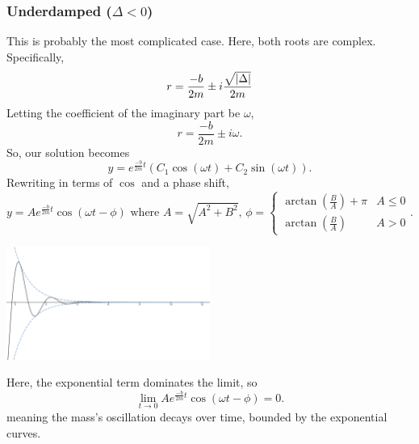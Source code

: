 \subsubsection{Underdamped ($\Delta < 0$)}
This is probably the most complicated case.
Here, both roots are complex.
Specifically,
\begin{equation*}
	r = \frac{-b}{2m} \pm i\frac{\sqrt{\lvert \Delta \rvert}}{2m}
\end{equation*}
Letting the coefficient of the imaginary part be $\omega$,
\begin{equation*}
	r = \frac{-b}{2m} \pm i\omega.
\end{equation*}
So, our solution becomes
\begin{equation*}
	y = e^{\frac{-b}{2m} t}\left(C_1\cos{(\omega t)} + C_2\sin{(\omega t)}\right).
\end{equation*}
Rewriting in terms of $\cos$ and a phase shift,
\begin{equation*}
	y = Ae^{\frac{-b}{2m} t}\cos{(\omega t - \phi)} \text{ where }
	A = \sqrt{A^2 + B^2} \text{, } \phi = \begin{cases}
		\arctan{\left(\frac{B}{A}\right)} + \pi & A \leq 0 \\
		\arctan{\left(\frac{B}{A}\right)} & A > 0
	\end{cases}.
\end{equation*}
\begin{center}
	\includegraphics[width=0.5\textwidth]{./higherOrder/freeVibrs/underdamped.png}
\end{center}
Here, the exponential term dominates the limit, so
\begin{equation*}
	\lim\limits_{t \to 0}{Ae^{\frac{-b}{2m}t}\cos{(\omega t - \phi)}} = 0.
\end{equation*}
meaning the mass's oscillation decays over time, bounded by the exponential curves. 